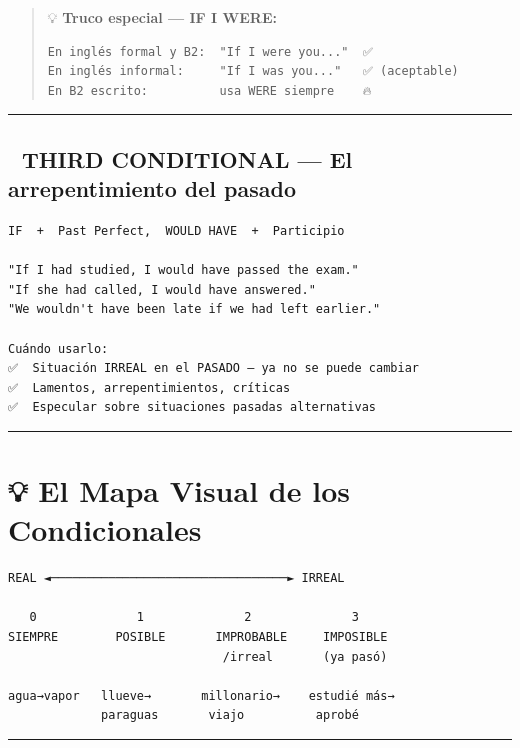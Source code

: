 \documentclass[
  spanish,
  letterpaper,
]{scrbook}
\begin{document}
\begin{quote}
💡 \textbf{Truco especial --- IF I WERE:}

\begin{verbatim}
En inglés formal y B2:  "If I were you..."  ✅
En inglés informal:     "If I was you..."   ✅ (aceptable)
En B2 escrito:          usa WERE siempre    🔥
\end{verbatim}
\end{quote}

\begin{center}\rule{0.5\linewidth}{0.5pt}\end{center}

\subsection{🔴 THIRD CONDITIONAL --- El arrepentimiento del
pasado}\label{third-conditional-el-arrepentimiento-del-pasado}

\begin{verbatim}
IF  +  Past Perfect,  WOULD HAVE  +  Participio

"If I had studied, I would have passed the exam."
"If she had called, I would have answered."
"We wouldn't have been late if we had left earlier."

Cuándo usarlo:
✅  Situación IRREAL en el PASADO — ya no se puede cambiar
✅  Lamentos, arrepentimientos, críticas
✅  Especular sobre situaciones pasadas alternativas
\end{verbatim}

\begin{center}\rule{0.5\linewidth}{0.5pt}\end{center}

\section{💡 El Mapa Visual de los
Condicionales}\label{el-mapa-visual-de-los-condicionales}

\begin{verbatim}
REAL ◄─────────────────────────────────► IRREAL

   0              1              2              3
SIEMPRE        POSIBLE       IMPROBABLE     IMPOSIBLE
                              /irreal       (ya pasó)

agua→vapor   llueve→       millonario→    estudié más→
             paraguas       viajo          aprobé
\end{verbatim}

\begin{center}\rule{0.5\linewidth}{0.5pt}\end{center}
\end{document}
